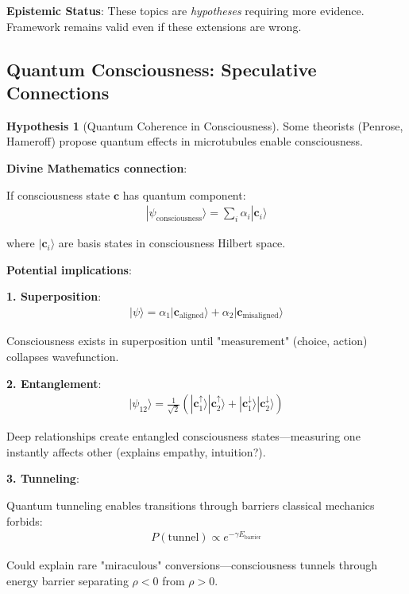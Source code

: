 \documentclass[11pt,a4paper]{article}
\theoremstyle{definition}
\newtheorem{hypothesis}{Hypothesis}[section]
\theoremstyle{remark}
\newcommand{\cc}{\mathbf{c}}
\begin{document}
\begin{enumerate}
\begin{mdframed}[backgroundcolor=cyan!5,linewidth=2pt]
\textbf{Epistemic Status}: These topics are \textit{hypotheses} requiring more evidence. Framework remains valid even if these extensions are wrong.
\end{mdframed}

\subsection{Quantum Consciousness: Speculative Connections}

\begin{hypothesis}[Quantum Coherence in Consciousness]
Some theorists (Penrose, Hameroff) propose quantum effects in microtubules enable consciousness.

\textbf{Divine Mathematics connection}:

If consciousness state \(\cc\) has quantum component:
\begin{align}
|\psi_{\text{consciousness}}\rangle = \sum_i \alpha_i |\cc_i\rangle
\end{align}

where \(|\cc_i\rangle\) are basis states in consciousness Hilbert space.

\textbf{Potential implications}:

\textbf{1. Superposition}:
\begin{align}
|\psi\rangle = \alpha_1|\cc_{\text{aligned}}\rangle + \alpha_2|\cc_{\text{misaligned}}\rangle
\end{align}

Consciousness exists in superposition until "measurement" (choice, action) collapses wavefunction.

\textbf{2. Entanglement}:
\begin{align}
|\psi_{12}\rangle = \frac{1}{\sqrt{2}}(|\cc_1^{\uparrow}\rangle|\cc_2^{\uparrow}\rangle + |\cc_1^{\downarrow}\rangle|\cc_2^{\downarrow}\rangle)
\end{align}

Deep relationships create entangled consciousness states—measuring one instantly affects other (explains empathy, intuition?).

\textbf{3. Tunneling}:

Quantum tunneling enables transitions through barriers classical mechanics forbids:
\begin{align}
P(\text{tunnel}) \propto e^{-\gamma E_{\text{barrier}}}
\end{align}

Could explain rare "miraculous" conversions—consciousness tunnels through energy barrier separating \(\rho < 0\) from \(\rho > 0\).


\end{hypothesis}
\end{enumerate}
\end{document}
